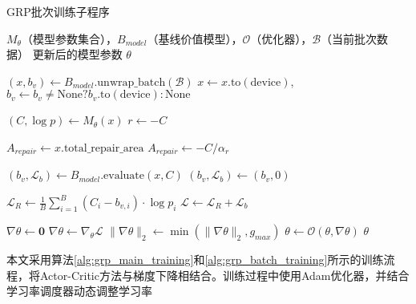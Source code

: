 \documentclass[AutoFakeBold]{LZUThesis}
\begin{document}
\begin{algorithm}[H]
	\begin{algorithmic}[1]
		\caption{GRP批次训练子程序}
		\label{alg:grp_batch_training}
		\Require $M_{\theta}$（模型参数集合），$B_{model}$（基线价值模型），$\mathcal{O}$（优化器），$\mathcal{B}$（当前批次数据）
		\Ensure 更新后的模型参数 $\theta$

		\State $(x, b_v) \leftarrow B_{model}.\text{unwrap\_batch}(\mathcal{B})$ 
		\State $x \leftarrow x.\text{to}(\text{device})$, $b_v \leftarrow b_v \neq \text{None} ? b_v.\text{to}(\text{device}) : \text{None}$ 

		\State $(C, \log p) \leftarrow M_{\theta}(x)$ 
		\State $r \leftarrow -C$ 

		\State $A_{repair} \leftarrow x.\text{total\_repair\_area}$ 
		\Else
		\State $A_{repair} \leftarrow -C / \alpha_{r}$ 
		\EndIf

		\State $(b_v, \mathcal{L}_{b}) \leftarrow B_{model}.\text{evaluate}(x, C)$ 
		\Else
		\State $(b_v, \mathcal{L}_{b}) \leftarrow (b_v, 0)$ 
		\EndIf

		\State $\mathcal{L}_{R} \leftarrow \frac{1}{B}\sum_{i=1}^{B}(C_i - b_{v,i}) \cdot \log p_i$ 
		\State $\mathcal{L} \leftarrow \mathcal{L}_{R} + \mathcal{L}_{b}$ 

		\State $\nabla\theta \leftarrow \mathbf{0}$ 
		\State $\nabla\theta \leftarrow \nabla_{\theta}\mathcal{L}$ 
		\State $\|\nabla\theta\|_2 \leftarrow \min(\|\nabla\theta\|_2, g_{max})$ 
		\State $\theta \leftarrow \mathcal{O}(\theta, \nabla\theta)$ 
		\State \Return $\theta$ 
	\end{algorithmic}
\end{algorithm}

本文采用算法\ref{alg:grp_main_training}和\ref{alg:grp_batch_training}所示的训练流程，将Actor-Critic方法与梯度下降相结合。训练过程中使用Adam优化器，并结合学习率调度器动态调整学习率
\end{document}
